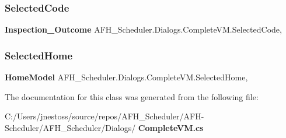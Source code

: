 \subsubsection{SelectedCode}
{\footnotesize\ttfamily \textbf{ Inspection\+\_\+\+Outcome} A\+F\+H\+\_\+\+Scheduler.\+Dialogs.\+Complete\+V\+M.\+Selected\+Code\hspace{0.3cm}{\ttfamily [get]}, {\ttfamily [set]}}

\mbox{\label{class_a_f_h___scheduler_1_1_dialogs_1_1_complete_v_m_a2e7b60206321cb93108a8da5feeee79c}} 
\subsubsection{SelectedHome}
{\footnotesize\ttfamily \textbf{ Home\+Model} A\+F\+H\+\_\+\+Scheduler.\+Dialogs.\+Complete\+V\+M.\+Selected\+Home\hspace{0.3cm}{\ttfamily [get]}, {\ttfamily [set]}}



The documentation for this class was generated from the following file\+:\begin{DoxyCompactItemize}
\item 
C\+:/\+Users/jnestoss/source/repos/\+A\+F\+H\+\_\+\+Scheduler/\+A\+F\+H-\/\+Scheduler/\+A\+F\+H\+\_\+\+Scheduler/\+Dialogs/\textbf{ Complete\+V\+M.\+cs}\end{DoxyCompactItemize}
